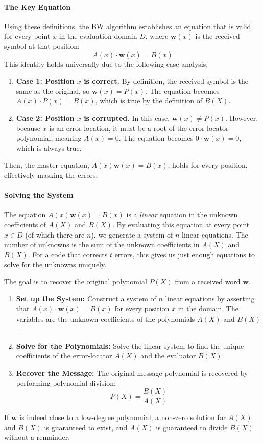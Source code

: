 \documentclass{article}
\begin{document}
\paragraph{The Key Equation}
Using these definitions, the BW algorithm establishes an equation that is valid for every point $x$ in the evaluation domain $D$, where $\mathbf{w}(x)$ is the received symbol at that position:
\[ A(x) \cdot \mathbf{w}(x) = B(x) \]
This identity holds universally due to the following case analysis:
\begin{enumerate}
    \item \textbf{Case 1: Position $x$ is correct.} By definition, the received symbol is the same as the original, so $\mathbf{w}(x) = P(x)$. The equation becomes $A(x) \cdot P(x) = B(x)$, which is true by the definition of $B(X)$.
    \item \textbf{Case 2: Position $x$ is corrupted.} In this case, $\mathbf{w}(x) \neq P(x)$. However, because $x$ is an error location, it must be a root of the error-locator polynomial, meaning $A(x) = 0$. The equation becomes $0 \cdot \mathbf{w}(x) = 0$, which is always true.
\end{enumerate}
Then, the master equation, $A(x)\mathbf{w}(x) = B(x)$, holds for every position, effectively masking the errors.

\paragraph{Solving the System}
The equation $A(x)\mathbf{w}(x) = B(x)$ is a \textit{linear} equation in the unknown coefficients of $A(X)$ and $B(X)$. By evaluating this equation at every point $x \in D$ (of which there are $n$), we generate a system of $n$ linear equations. The number of unknowns is the sum of the unknown coefficients in $A(X)$ and $B(X)$. For a code that corrects $t$ errors, this gives us just enough equations to solve for the unknowns uniquely.


\begin{tcolorbox}[breakable, title={The Berlekamp-Welch Algorithm: A Summary}]
The goal is to recover the original polynomial $P(X)$ from a received word $\mathbf{w}$.
\begin{enumerate}
    \item \textbf{Set up the System:} Construct a system of $n$ linear equations by asserting that $A(x) \cdot \mathbf{w}(x) = B(x)$ for every position $x$ in the domain. The variables are the unknown coefficients of the polynomials $A(X)$ and $B(X)$.
    \item \textbf{Solve for the Polynomials:} Solve the linear system to find the unique coefficients of the error-locator $A(X)$ and the evaluator $B(X)$.
    \item \textbf{Recover the Message:} The original message polynomial is recovered by performing polynomial division:
    \[ P(X) = \frac{B(X)}{A(X)} \]
\end{enumerate}
If $\mathbf{w}$ is indeed close to a low-degree polynomial, a non-zero solution for $A(X)$ and $B(X)$ is guaranteed to exist, and $A(X)$ is guaranteed to divide $B(X)$ without a remainder.
\end{tcolorbox}
\end{document}
